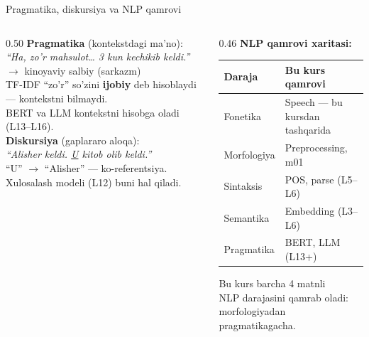 \documentclass[aspectratio=169,11pt]{beamer}
\begin{document}
\begin{frame}{Pragmatika, diskursiya va NLP qamrovi}
  \begin{columns}[T]
    \begin{column}{0.50\textwidth}
      \textbf{Pragmatika} (kontekstdagi ma'no):\\[3pt]
      \small
      \textit{``Ha, zo'r mahsulot\ldots{} 3 kun kechikib keldi.''}\\
      \footnotesize$\to$ \alert{kinoyaviy salbiy} (sarkazm)\\[4pt]
      TF-IDF ``zo'r'' so'zini \textbf{ijobiy} deb hisoblaydi ---
      kontekstni bilmaydi.\\
      BERT va LLM kontekstni hisobga oladi (L13--L16).\\[5pt]
      \textbf{Diskursiya} (gaplararo aloqa):\\[3pt]
      \small
      \textit{``Alisher keldi. \underline{U} kitob olib keldi.''}\\
      \footnotesize``U'' $\to$ ``Alisher'' --- ko-referentsiya.\\
      Xulosalash modeli (L12) buni hal qiladi.
    \end{column}
    \begin{column}{0.46\textwidth}
      \textbf{NLP qamrovi xaritasi:}\\[4pt]
      \footnotesize
      \begin{tabular}{p{1.8cm}p{3.0cm}}
        \toprule
        Daraja & Bu kurs qamrovi\\
        \midrule
        Fonetika& \textcolor{halfgray}{Speech --- bu kursdan tashqarida}\\
        Morfologiya & Preprocessing, m01 \\
        Sintaksis   & POS, parse (L5--L6) \\
        Semantika   & Embedding (L3--L6) \\
        Pragmatika  & BERT, LLM (L13+) \\
        \bottomrule
      \end{tabular}
      \vspace{4pt}
      \begin{tcolorbox}[okbox,title=Xulosa,top=2pt,bottom=2pt]
        \footnotesize
        Bu kurs barcha 4 matnli\\
        NLP darajasini qamrab oladi:\\
        morfologiyadan pragmatikagacha.
      \end{tcolorbox}
    \end{column}
  \end{columns}
\end{frame}
\end{document}
